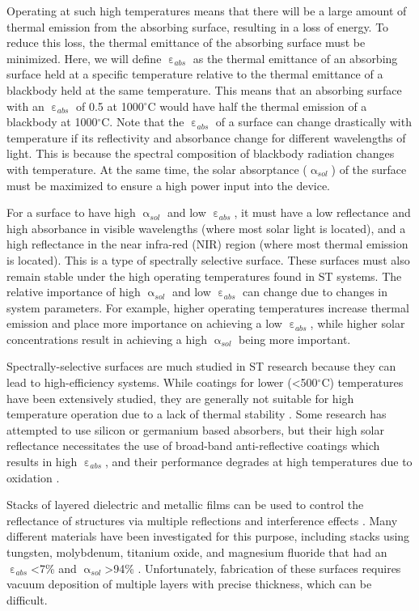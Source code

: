 \documentclass[10pt,letterpaper]{article}
\begin{document}
Operating at such high temperatures means that there will be a large amount of thermal emission from the absorbing surface, resulting in a loss of energy.  To reduce this loss, the thermal emittance of the absorbing surface must be minimized.  Here, we will define $\upepsilon_{abs}$ as the thermal emittance of an absorbing surface held at a specific temperature relative to the thermal emittance of a blackbody held at the same temperature.  This means that an absorbing surface with an $\upepsilon_{abs}$ of 0.5 at 1000$^\circ$C would have half the thermal emission of a blackbody at 1000$^\circ$C.  Note that the $\upepsilon_{abs}$ of a surface can change drastically with temperature if its reflectivity and absorbance change for different wavelengths of light.  This is because the spectral composition of blackbody radiation changes with temperature.  At the same time, the solar absorptance ($\upalpha_{sol}$) of the surface must be maximized to ensure a high power input into the device.

For a surface to have high $\upalpha_{sol}$ and low $\upepsilon_{abs}$, it must have a low reflectance and high absorbance in visible wavelengths (where most solar light is located), and a high reflectance in the near infra-red (NIR) region (where most thermal emission is located).  This is a type of spectrally selective surface.  These surfaces must also remain stable under the high operating temperatures found in ST systems.  The relative importance of high $\upalpha_{sol}$ and low $\upepsilon_{abs}$ can change due to changes in system parameters.  For example, higher operating temperatures increase thermal emission and place more importance on achieving a low $\upepsilon_{abs}$, while higher solar concentrations result in achieving a high $\upalpha_{sol}$ being more important.

Spectrally-selective surfaces are much studied in ST research 
because they can lead to high-efficiency systems.  While coatings for lower (\textless500$^\circ$C) temperatures have been extensively studied, they are generally not suitable for high temperature operation due to a lack of thermal stability \cite{A1}.  Some research has attempted to use silicon or germanium based absorbers, but their high solar reflectance necessitates the use of broad-band anti-reflective coatings which results in high $\upepsilon_{abs}$, and their performance degrades at high temperatures due to oxidation \cite{A2}. 

Stacks of layered dielectric and metallic films can be used to control the reflectance of structures via multiple reflections and interference effects \cite{A3}.  Many different materials have been investigated for this purpose, including stacks using tungsten, molybdenum, titanium oxide, and magnesium fluoride that had an $\upepsilon_{abs}$\textless7\% and $\upalpha_{sol}$\textgreater94\% \cite{paper1_ref7,stacks2, A2}.  Unfortunately, fabrication of these surfaces requires vacuum deposition of multiple layers with precise thickness, which can be difficult.
\end{document}
